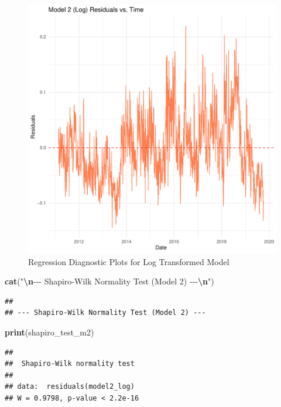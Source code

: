 \documentclass[
]{article}
\newenvironment{Shaded}{\begin{snugshade}}{\end{snugshade}}
\newcommand{\FunctionTok}[1]{\textcolor[rgb]{0.13,0.29,0.53}{\textbf{#1}}}
\newcommand{\NormalTok}[1]{#1}
\newcommand{\SpecialCharTok}[1]{\textcolor[rgb]{0.81,0.36,0.00}{\textbf{#1}}}
\newcommand{\StringTok}[1]{\textcolor[rgb]{0.31,0.60,0.02}{#1}}
\begin{document}
\begin{figure}
\centering
\includegraphics{FinalProject_files/figure-latex/model2-diagnostics-6.pdf}
\caption{Regression Diagnostic Plots for Log Transformed Model}
\end{figure}

\begin{Shaded}
\begin{Highlighting}[]
    \FunctionTok{cat}\NormalTok{(}\StringTok{"}\SpecialCharTok{\textbackslash{}n}\StringTok{{-}{-}{-} Shapiro{-}Wilk Normality Test (Model 2) {-}{-}{-}}\SpecialCharTok{\textbackslash{}n}\StringTok{"}\NormalTok{)}
\end{Highlighting}
\end{Shaded}

\begin{verbatim}
## 
## --- Shapiro-Wilk Normality Test (Model 2) ---
\end{verbatim}

\begin{Shaded}
\begin{Highlighting}[]
    \FunctionTok{print}\NormalTok{(shapiro\_test\_m2)}
\end{Highlighting}
\end{Shaded}

\begin{verbatim}
## 
##  Shapiro-Wilk normality test
## 
## data:  residuals(model2_log)
## W = 0.9798, p-value < 2.2e-16
\end{verbatim}
\end{document}
